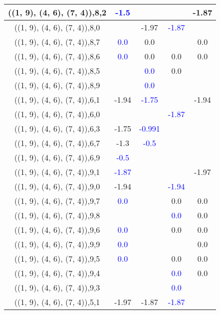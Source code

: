 \documentclass{article}
\begin{document}
\begin{center}
\begin{longtable}{|c|c|c|c|c|}
        	\hline
        	((1, 9), (4, 6), (7, 4)),8,2& \textcolor{blue}{-1.5}&&&-1.87\\
        	\hline
        	((1, 9), (4, 6), (7, 4)),8,0&&-1.97& \textcolor{blue}{-1.87}&\\
        	\hline
        	((1, 9), (4, 6), (7, 4)),8,7& \textcolor{blue}{0.0}&0.0&&0.0\\
        	\hline
        	((1, 9), (4, 6), (7, 4)),8,6& \textcolor{blue}{0.0}&0.0&0.0&0.0\\
        	\hline
        	((1, 9), (4, 6), (7, 4)),8,5&& \textcolor{blue}{0.0}&0.0&\\
        	\hline
        	((1, 9), (4, 6), (7, 4)),8,9&& \textcolor{blue}{0.0}&&\\
        	\hline
        	((1, 9), (4, 6), (7, 4)),6,1&-1.94& \textcolor{blue}{-1.75}&&-1.94\\
        	\hline
        	((1, 9), (4, 6), (7, 4)),6,0&&& \textcolor{blue}{-1.87}&\\
        	\hline
        	((1, 9), (4, 6), (7, 4)),6,3&-1.75& \textcolor{blue}{-0.991}&&\\
        	\hline
        	((1, 9), (4, 6), (7, 4)),6,7&-1.3& \textcolor{blue}{-0.5}&&\\
        	\hline
        	((1, 9), (4, 6), (7, 4)),6,9& \textcolor{blue}{-0.5}&&&\\
        	\hline
        	((1, 9), (4, 6), (7, 4)),9,1& \textcolor{blue}{-1.87}&&&-1.97\\
        	\hline
        	((1, 9), (4, 6), (7, 4)),9,0&-1.94&& \textcolor{blue}{-1.94}&\\
        	\hline
        	((1, 9), (4, 6), (7, 4)),9,7& \textcolor{blue}{0.0}&&0.0&0.0\\
        	\hline
        	((1, 9), (4, 6), (7, 4)),9,8&&& \textcolor{blue}{0.0}&0.0\\
        	\hline
        	((1, 9), (4, 6), (7, 4)),9,6& \textcolor{blue}{0.0}&&0.0&0.0\\
        	\hline
        	((1, 9), (4, 6), (7, 4)),9,9& \textcolor{blue}{0.0}&&&0.0\\
        	\hline
        	((1, 9), (4, 6), (7, 4)),9,5& \textcolor{blue}{0.0}&&0.0&0.0\\
        	\hline
        	((1, 9), (4, 6), (7, 4)),9,4&&& \textcolor{blue}{0.0}&0.0\\
        	\hline
        	((1, 9), (4, 6), (7, 4)),9,3&&& \textcolor{blue}{0.0}&\\
        	\hline
        	((1, 9), (4, 6), (7, 4)),5,1&-1.97&-1.87& \textcolor{blue}{-1.87}&\\

\end{longtable}
\end{center}
\end{document}
